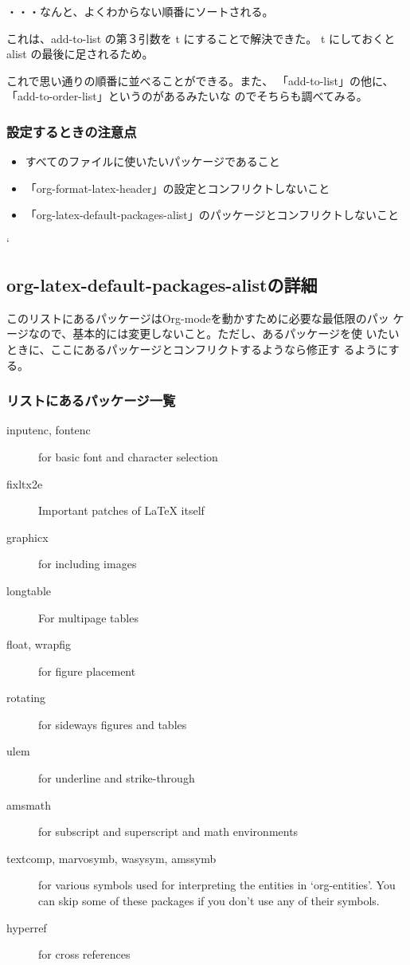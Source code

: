 \documentclass[dvipdfmx,12pt]{jsarticle}
\begin{document}
・・・なんと、よくわからない順番にソートされる。

これは、add-to-list の第３引数を t にすることで解決できた。
t にしておくとalist の最後に足されるため。

これで思い通りの順番に並べることができる。また、
「add-to-list」の他に、「add-to-order-list」というのがあるみたいな
のでそちらも調べてみる。


\subsubsection{設定するときの注意点}
\label{sec-3-3-2}
\begin{itemize}
\item すべてのファイルに使いたいパッケージであること
\item 「org-format-latex-header」の設定とコンフリクトしないこと
\item 「org-latex-default-packages-alist」のパッケージとコンフリクトしないこと
\end{itemize}
`

\subsection{org-latex-default-packages-alistの詳細}
\label{sec-3-4}

このリストにあるパッケージはOrg-modeを動かすために必要な最低限のパッ
ケージなので、基本的には変更しないこと。ただし、あるパッケージを使
いたいときに、ここにあるパッケージとコンフリクトするようなら修正す
るようにする。

\subsubsection{リストにあるパッケージ一覧}
\label{sec-3-4-1}
\begin{description}
\item[{inputenc, fontenc}] for basic font and character selection
\item[{fixltx2e}] Important patches of \LaTeX{} itself
\item[{graphicx}] for including images
\item[{longtable}] For multipage tables
\item[{float, wrapfig}] for figure placement
\item[{rotating}] for sideways figures and tables
\item[{ulem}] for underline and strike-through
\item[{amsmath}] for subscript and superscript and math environments
\item[{textcomp, marvosymb, wasysym, amssymb}] for various symbols used
for interpreting the entities in `org-entities'.  You can skip
some of these packages if you don't use any of their symbols.
\item[{hyperref}] for cross references
\end{description}
\end{document}
